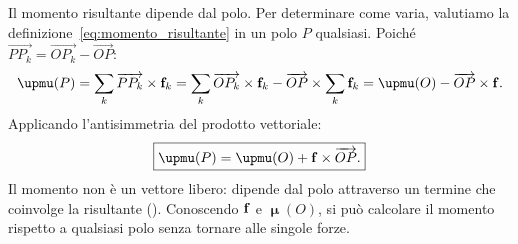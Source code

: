 Il momento risultante dipende dal polo. Per determinare come
varia, valutiamo la definizione~\eqref{eq:momento_risultante}
in un polo $P$ qualsiasi. Poiché
$\overrightarrow{PP_k} = \overrightarrow{OP_k} -
\overrightarrow{OP}$:
\begin{equation}
	\bm{\upmu}(P)
	= \sum_k \overrightarrow{PP_k} \times \fb_k
	= \sum_k \overrightarrow{OP_k} \times \fb_k
	- \overrightarrow{OP} \times \sum_k \fb_k
	= \bm{\upmu}(O) - \overrightarrow{OP} \times \fb.
\end{equation}
Applicando l'antisimmetria del prodotto vettoriale:
\begin{equation}\label{eq:variazione_momento}
	\boxed{\bm{\upmu}(P)
		= \bm{\upmu}(O) + \fb \times \overrightarrow{OP}.}
\end{equation}
Il momento non è un vettore libero: dipende dal polo
attraverso un termine che coinvolge la risultante (). Conoscendo
$\mathbf{f}$ e $\bm{\upmu}(O)$, si può calcolare il momento rispetto
a qualsiasi polo senza tornare alle singole forze.

